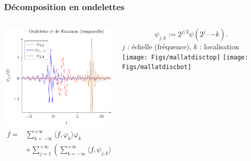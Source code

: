 \documentclass{beamer}
\begin{document}
	\begin{frame}
		\frametitle{Décomposition en ondelettes}
		\begin{columns}[T]
			\begin{column}{.3\textwidth}
				\includegraphics[width=\textwidth]{Figs/shannonspat}
				\begin{align*}
					f =&\sum_{k=-\infty}^{+\infty} \langle f, \varphi_k \rangle\varphi_k \\
					&+ \sum_{j=1}^{+\infty} \left(\sum_{k=-\infty}^{+\infty} \langle f, \psi_{j,k} \rangle \psi_{j,k}\right)
				\end{align*}
			\end{column}
			\begin{column}{.6\textwidth}
				\begin{equation*}
					\psi_{j,k} := 2^{j/2}\psi(2^j\cdot -k).
				\end{equation*}
				$j$ : échelle (fréquence), $k$ : localisation
				\texttt{[image: Figs/mallatdisctop]}
				\texttt{[image: Figs/mallatdiscbot]}
			\end{column}
		\end{columns}
	\end{frame}
\end{document}
